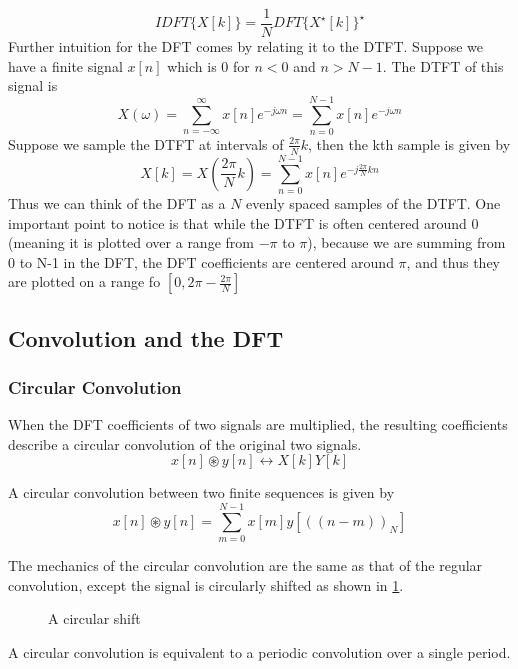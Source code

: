 \[
  IDFT\{X[k]\} = \frac{1}{N}DFT\{X^\star[k]\}^\star
\]
Further intuition for the DFT comes by relating it to the DTFT. Suppose we have a finite signal $x[n]$ which is $0$ for $n < 0$ and $n > N-1$.
The DTFT of this signal is
\[
  X(\omega) = \sum_{n=-\infty}^{\infty}{x[n]e^{-j\omega n}} = \sum_{n=0}^{N-1}{x[n]e^{-j\omega n}}
\]
Suppose we sample the DTFT at intervals of $\frac{2\pi}{N}k$, then the kth sample is given by
\[
  X[k] = X\left(\frac{2\pi}{N}k\right) = \sum_{n=0}^{N-1}{x[n]e^{-j\frac{2\pi}{N}k n}}
\]
Thus we can think of the DFT as a $N$ evenly spaced samples of the DTFT.
One important point to notice is that while the DTFT is often centered around 0 (meaning it is plotted over a range from $-\pi$ to $\pi$), because we are summing
from 0 to N-1 in the DFT, the DFT coefficients are centered around $\pi$, and thus they are plotted on a range fo $[0, 2\pi - \frac{2\pi}{N}]$
\subsection{Convolution and the DFT}
\subsubsection{Circular Convolution}
When the DFT coefficients of two signals are multiplied, the resulting coefficients describe a circular convolution of the original two signals.
\[
  x[n]\circledast y[n] \leftrightarrow X[k]Y[k]
\]
\begin{definition}
  A circular convolution between two finite sequences is given by
  \[
	x[n]\circledast y[n] = \sum_{m=0}^{N-1}x[m]y[((n-m))_N]
  \]
  \label{defn:circular-conv}
\end{definition}
The mechanics of the circular convolution are the same as that of the regular convolution, except the signal is circularly shifted as shown in \cref{fig:circular-shift}.
\begin{gitbook-image}
\begin{figure}[h!]
  \centering
  \caption{A circular shift}
  \label{fig:circular-shift}
\end{figure}
\end{gitbook-image}
A circular convolution is equivalent to a periodic convolution over a single period.
